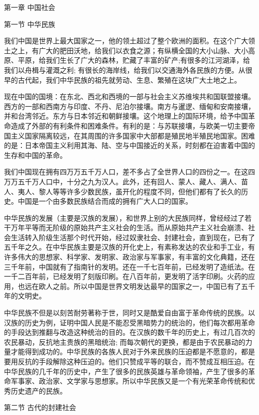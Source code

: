 \documentclass[UTF8, 12pt, a4paper]{ctexrep}
\begin{document}
第一章 中国社会

第一节 中华民族

我们中国是世界上最大国家之一，他的领土超过了整个欧洲的面积。在这个广大领土之上，有广大的肥田沃地，给我们以衣食之源；有纵横全国的大小山脉、大小高原、平原，给我们生长了广大的森林，贮藏了丰富的矿产;有很多的江河湖泽，给我们以舟楫与灌溉之利; 有很长的海岸线，给我们以交通海外各民族的方便。从很早的古代起，我们中华民族的祖先就劳动、生息、繁殖在这块广大土地之上。

现在中国的国境：在东北、西北和西境的一部与社会主义苏维埃共和国联盟接壤。西方的一部和西南方与印度、不丹、尼泊尔接壤。南方与暹逻、缅甸和安南接壤，并和台湾邻近。东方与日本邻近和朝鲜接壤。这个地理上的国际环境，给予中国革命造成了外部的有利条件和困难条件。有利的是：与苏联接壤，与欧美一切主要帝国主义国家隔离较远，在其周围的许多国家中大部都是殖民地半殖民地国家。困难的是：日本帝国主义利用其海、陆、空与中国接近的关系，时刻都在迫害着中国的生存和中国的革命。

我们中国现在拥有四万万五千万人口，差不多占了全世界人口的四份之一。在这四万万五千万人口中，十分之九为汉人。此外，还有回人、蒙人、藏人、满人、苗人、夷人、黎人等等许多少数民族，虽开化的程度不同，但他们都有了长久的历史。中国是一个由多数民族结合而成的拥有广大人口的国家。

中华民族的发展（主要是汉族的发展），和世界上别的大民族同样，曾经经过了若干万年平等而无阶级的原始共产主义社会的生活。而从原始共产主义社会崩溃、社会生活转入阶级生活那个时代开始，经过奴隶社会、封建社会，直到现在，已有了五千年之久。在中华民族主要是汉族的开化史上，有素称发达的农业和手工业，有许多伟大的思想家、科学家、发明家、政治家与军事家，有丰富的文化典籍，还在三千年前，中国就有了指南针的发明。还在一千七百年前，已经发明了造纸法。在一千二百年前，已经发明了刻版印刷。在八百年前，更发明了活字印刷。火药的应用，也远在欧人之前。所以中国是世界文明发达最早的国家之一，中国已有了五千年的文明史。

中华民族不但是以刻苦耐劳著称于世，同时又是酷爱自由富于革命传统的民族。以汉族的历史为例，证明中国人民是不能忍受黑暗势力的统治的，他们每次都用革命的手段达到推翻与改造这种统治的目的。在汉族的数千年的历史上，有过几百次的农民暴动，反抗地主贵族的黑暗统治; 而每次朝代的更换，都是由于农民暴动的力量才能得到成功的。中华民族的各族人民对于外来民族的压迫都是不愿意的，都是要用反抗的手段解除这种压迫的。他们只赞成平等的联合，而不赞成互相压迫。在中华民族的几千年的历史中，产生了很多的民族英雄与革命领袖，产生了很多的革命军事家、政治家、文学家与思想家。所以中华民族又是一个有光荣革命传统和优秀历史遗产的民族。

第二节 古代的封建社会
\end{document}
